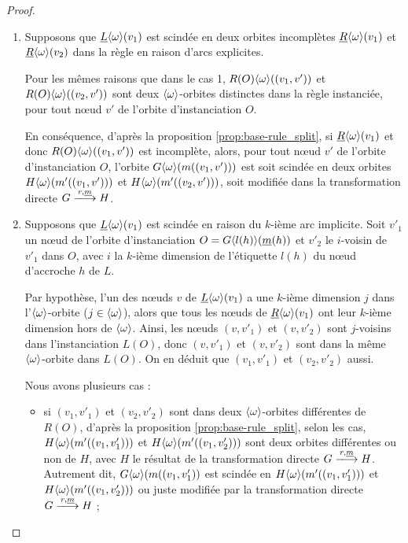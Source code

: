 \begin{proof}
\begin{enumerate}
		\item
		      Supposons que $\underline{L}\langle\omega\rangle(v_1)$ est scindée en deux orbites incomplètes
		      $\underline{R}\langle\omega\rangle(v_1)$ et $\underline{R}\langle\omega\rangle(v_2)$ dans la règle en raison d'arcs explicites.

		      Pour les mêmes raisons que dans le cas 1, $R(O)\langle\omega\rangle((v_1,v'))$ et
		      $R(O)\langle\omega\rangle((v_2,v'))$ sont deux $\langle\omega\rangle$-orbites distinctes dans la
		      règle instanciée, pour tout n\oe ud $v'$ de l'orbite d'instanciation $O$.

		      En conséquence, d'après la proposition \ref{prop:base-rule_split}, si $\underline{R}\langle\omega\rangle(v_1)$
		      et donc $R(O)\langle\omega\rangle((v_1, v'))$ est incomplète, alors, pour tout n\oe ud
		      $v'$ de l'orbite d'instanciation $O$, l'orbite
		      $G\langle\omega\rangle(m((v_1,v')))$ est soit scindée en deux orbites
		      $H\langle\omega\rangle(m'((v_1, v')))$ et $H\langle\omega\rangle(m'((v_2, v')))$, soit modifiée dans
		      la transformation directe $G \xlongrightarrow{r,\underline{m}} H$.  %

		\item
		      Supposons que $\underline{L}\langle\omega\rangle(v_1)$ est scindée en raison du $k$-ième arc
		      implicite. Soit $v'_1$ un n\oe ud de l'orbite d'instanciation
		      $O = G\langle l(h)\rangle(\underline{m}(h))$ et $v'_2$ le $i$-voisin de $v'_1$ dans
		      $O$, avec $i$ la $k$-ième dimension de l'étiquette $l(h)$ du n\oe ud d'accroche $h$
		      de $L$.

		      Par hypothèse, l'un des n\oe uds $v$ de $\underline{L}\langle\omega\rangle(v_1)$ a une
		      $k$-ième dimension $j$ dans l'$\langle\omega\rangle$-orbite ($j \in \langle\omega\rangle$), alors que tous
		      les n\oe uds de $\underline{R}\langle\omega\rangle(v_1)$ ont leur $k$-ième dimension hors de
		      $\langle\omega\rangle$. Ainsi, les n\oe uds $(v, v'_1)$ et $(v, v'_2)$ sont $j$-voisins dans
		      l'instanciation $L(O)$, donc $(v, v'_1)$ et $(v, v'_2)$ sont dans la même
		      $\langle\omega\rangle$-orbite dans $L(O)$. On en déduit que $(v_1, v'_1)$ et $(v_2, v'_2)$ aussi.

		      Nous avons plusieurs cas :
		      \begin{itemize}
			      \item si $(v_1, v'_1)$ et $(v_2, v'_2)$ sont dans deux $\langle\omega\rangle$-orbites
			            différentes de $R(O)$, d'après la proposition \ref{prop:base-rule_split}, selon
			            les cas, $H\langle\omega\rangle(m'((v_1, v'_1)))$ et $H\langle\omega\rangle(m'((v_1,v'_2)))$ sont
			            deux orbites différentes ou non de $H$, avec $H$ le résultat de la
			            transformation directe $G \xlongrightarrow{r, \underline{m}} H$. Autrement dit,
			            $G\langle\omega\rangle(m((v_1, v'_1))$ est scindée en $H\langle\omega\rangle(m'((v_1, v'_1)))$ et
			            $H\langle\omega\rangle(m'((v_1,v'_2)))$ ou juste modifiée par la transformation directe
			            $G \xlongrightarrow{r, \underline{m}} H$ ;


\end{itemize}
\end{enumerate}
\end{proof}
